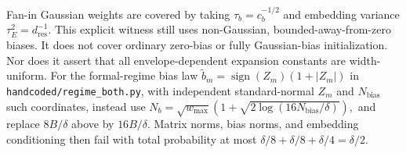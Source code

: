 Fan-in Gaussian weights are covered by taking $\tau_b=c_b^{-1/2}$ and
embedding variance $\tau_E^2=d_{\mathrm{res}}^{-1}$. This explicit witness
still uses non-Gaussian, bounded-away-from-zero biases. It does not cover
ordinary zero-bias or fully Gaussian-bias initialization. Nor does it
assert that all envelope-dependent expansion constants are width-uniform.
For the formal-regime bias law $\tilde b_m=\operatorname{sign}(Z_m)(1+|Z_m|)$
in \nolinkurl{handcoded/regime_both.py}, with independent standard-normal
$Z_m$ and $N_{\mathrm{bias}}$ such coordinates, instead use
 $N_b=\sqrt{w_{\max}}\left(1+\sqrt{2\log(16N_{\mathrm{bias}}/\delta)}\right),$ 
and replace $8B/\delta$ above by $16B/\delta$. Matrix norms, bias norms,
and embedding conditioning then fail with total probability at most
$\delta/8+\delta/8+\delta/4=\delta/2$.
